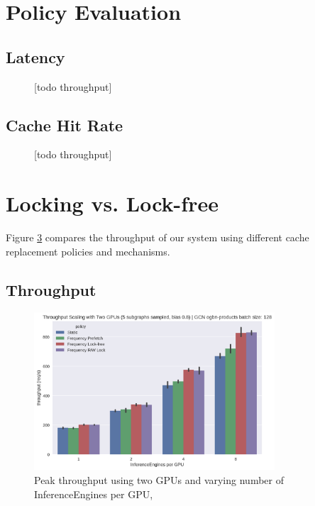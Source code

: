 \section{Policy Evaluation}

\subsection{Latency}
\begin{figure}[h!]
    \centering
    \caption{[todo throughput]}
    \label{Eval: Latency speedup}
\end{figure}    

\subsection{Cache Hit Rate}
\begin{figure}[h!]
    \centering
    \caption{[todo throughput]}
    \label{Eval: Hit Rate}
\end{figure}    
\section{Locking vs. Lock-free}

Figure \ref{Eval: Throughput} compares the throughput of our system using different cache replacement policies and mechanisms.

\subsection{Throughput}

\begin{figure}[h!]
    \centering
    \includegraphics[width=0.8\textwidth]{figures/throughput_GCN_bias_0.8_pinnedc0.2_gpus_2.png}
    \caption{Peak throughput using two GPUs and varying number of InferenceEngines per GPU,}
    \label{Eval: Throughput}
\end{figure}    

